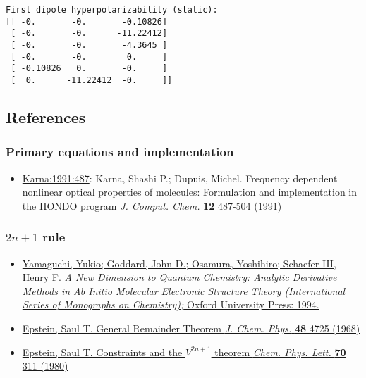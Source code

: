 \documentclass[]{article}
\providecommand{\tightlist}{%
  \setlength{\itemsep}{0pt}\setlength{\parskip}{0pt}}
\begin{document}
\begin{verbatim}
First dipole hyperpolarizability (static):
[[ -0.       -0.       -0.10826]
 [ -0.       -0.      -11.22412]
 [ -0.       -0.       -4.3645 ]
 [ -0.       -0.        0.     ]
 [ -0.10826   0.       -0.     ]
 [  0.      -11.22412  -0.     ]]
\end{verbatim}

\hypertarget{references}{%
\subsection{References}\label{references}}

\hypertarget{primary-equations-and-implementation}{%
\subsubsection{Primary equations and
implementation}\label{primary-equations-and-implementation}}

\begin{itemize}
\tightlist
\item
  \href{https://dx.doi.org/10.1002/jcc.540120409}{Karna:1991:487}:
  Karna, Shashi P.; Dupuis, Michel. Frequency dependent nonlinear
  optical properties of molecules: Formulation and implementation in the
  HONDO program \emph{J. Comput. Chem.} \textbf{12} 487-504 (1991)
\end{itemize}

\hypertarget{n-1-rule}{%
\subsubsection{\texorpdfstring{\(2n + 1\)
rule}{2n + 1 rule}}\label{n-1-rule}}

\begin{itemize}
\tightlist
\item
  \href{https://isbnsearch.org/isbn/9780195070286}{Yamaguchi, Yukio;
  Goddard, John D.; Osamura, Yoshihiro; Schaefer III, Henry F. \emph{A
  New Dimension to Quantum Chemistry: Analytic Derivative Methods in Ab
  Initio Molecular Electronic Structure Theory (International Series of
  Monographs on Chemistry);} Oxford University Press: 1994.}
\item
  \href{https://dx.doi.org/10.1063/1.1668053}{Epstein, Saul T. General
  Remainder Theorem \emph{J. Chem. Phys.} \textbf{48} 4725 (1968)}
\item
  \href{https://dx.doi.org/10.1016/0009-2614(80)85340-1}{Epstein, Saul
  T. Constraints and the \(V^{2n+1}\) theorem \emph{Chem. Phys. Lett.}
  \textbf{70} 311 (1980)}
\end{itemize}
\end{document}
